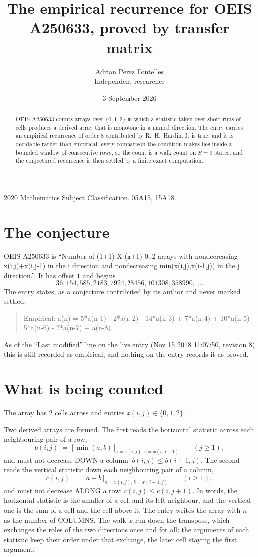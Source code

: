 \documentclass[11pt,a4paper]{article}
\title{The empirical recurrence for OEIS A250633, proved by transfer matrix}
\author{Adrian Perez Fontelles\\ \small Independent researcher}
\date{3 September 2026}
\theoremstyle{plain}
\theoremstyle{definition}
\begin{document}
\maketitle

\begin{abstract}
OEIS A250633 counts arrays over $\{0,1,2\}$ in which a statistic taken over short runs
of cells produces a derived array that is monotone in a named direction. The entry carries an
empirical recurrence of order $8$ contributed by R.~H.~Hardin. It is true, and it is
decidable rather than empirical: every comparison the condition makes lies inside a bounded
window of consecutive rows, so the count is a walk count on $S=9$ states, and the
conjectured recurrence is then settled by a finite exact computation.
\end{abstract}

\noindent\small 2020 Mathematics Subject Classification. 05A15, 15A18.\normalsize

\section{The conjecture}

OEIS A250633 is ``Number of (1+1) X (n+1) 0..2 arrays with nondecreasing x(i,j)+x(i,j-1) in the i direction and nondecreasing min(x(i,j),x(i-1,j)) in the j direction.''. It has offset $1$ and begins
\[
36, 154, 585, 2183, 7924, 28456, 101308, 358990,\ \dots
\]
The entry states, as a conjecture contributed by its author and never marked settled:
\begin{quote}
Empirical: a(n) = 5*a(n-1) - 2*a(n-2) - 14*a(n-3) + 7*a(n-4) + 10*a(n-5) - 5*a(n-6) - 2*a(n-7) + a(n-8).
\end{quote}
As of the ``Last modified'' line on the live entry (Nov 15 2018 11:07:50, revision 8) this is still
recorded as empirical, and nothing on the entry records it as proved.

\section{What is being counted}

The array has $2$ cells across and entries $x(i,j)\in\{0,1,2\}$.

Two derived arrays are formed. The first reads the horizontal statistic across each
neighbouring pair of a row,
\[
b(i,j)\;=\;\bigl[\,\min(a,b)\,\bigr]_{a=x(i,j),\,b=x(i,j-1)}\qquad (j\ge1),
\]
and must not decrease DOWN a column: $b(i,j)\le b(i{+}1,j)$. The second reads the vertical
statistic down each neighbouring pair of a column,
\[
c(i,j)\;=\;\bigl[\,a+b\,\bigr]_{a=x(i,j),\,b=x(i{-}1,j)}\qquad (i\ge1),
\]
and must not decrease ALONG a row: $c(i,j)\le c(i,j{+}1)$. In words, the horizontal statistic
is the smaller of a cell and its left neighbour, and the vertical one is
the sum of a cell and the cell above it. The entry writes the array with $n$ as the number of COLUMNS. The walk is run down the transpose, which exchanges the roles of the two directions once and for all; the arguments of each statistic keep their order under that exchange, the later cell staying the first argument.
\end{document}
